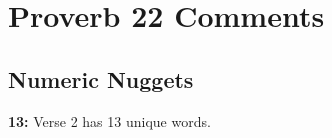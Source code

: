 \section{Proverb 22 Comments}

\subsection{Numeric Nuggets}
\textbf{13:} Verse 2 has 13 unique words.

